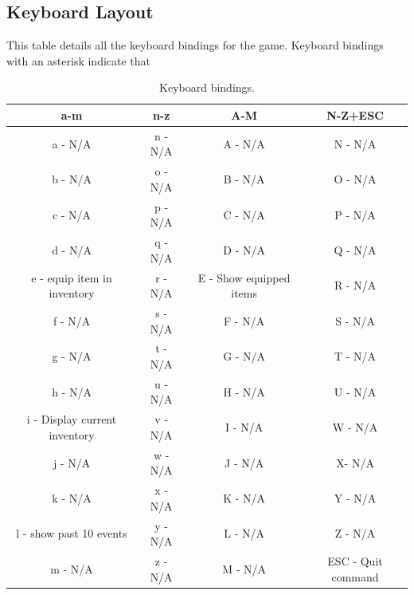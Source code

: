 \documentclass{report}
\begin{document}
\subsection*{Keyboard Layout}
This table details all the keyboard bindings for the game. Keyboard bindings with an asterisk indicate that
\begin{table}[h!]
\centering
\begin{tabular}{|c| c| c |c|} 
\hline
 a-m & n-z & A-M & N-Z+ESC \\ [0.5ex] 
 \hline
 a - N/A & n - N/A & A - N/A & N - N/A \\ 
 b - N/A & o - N/A & B - N/A & O - N/A \\
 c - N/A & p - N/A & C - N/A & P - N/A  \\
 d - N/A & q - N/A & D - N/A & Q - N/A  \\
 e - equip item in inventory & r - N/A & E - Show equipped items & R - N/A \\ 
 f - N/A & s - N/A & F - N/A & S - N/A \\
 g - N/A & t - N/A & G - N/A & T - N/A \\
 h - N/A & u - N/A & H - N/A & U - N/A \\
 i - Display current inventory & v - N/A & I - N/A & W - N/A \\
 j - N/A & w - N/A & J - N/A & X- N/A \\
 k - N/A & x - N/A & K - N/A & Y - N/A \\
 l - show past 10 events & y - N/A & L - N/A & Z - N/A \\
 m - N/A & z - N/A & M - N/A & ESC - Quit command \\ [1ex] 
 \hline
\end{tabular}
\caption{Keyboard bindings.}
\label{table:1}
\end{table}
\end{document}
